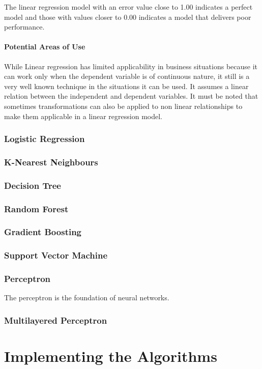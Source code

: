 \documentclass[12pt]{article}
\begin{document}
The linear regression model with an error value close to 1.00 indicates a perfect model and those with values closer to 0.00 indicates a model that delivers poor performance.

\subsection{Potential Areas of Use}
While Linear regression has limited applicability in business situations because it can work only when the dependent variable is of continuous nature, it still is a very well known technique in the situations it can be used. It assumes a linear relation between the independent and dependent variables. It must be noted that sometimes transformations can also be applied to non linear relationships to make them applicable in a linear regression model.
\newpage
\section{Logistic Regression}
\newpage
\section{K-Nearest Neighbours}
\newpage
\section{Decision Tree}
\newpage
\section{Random Forest}
\newpage
\section{Gradient Boosting}
\newpage
\section{Support Vector Machine}
\newpage
\section{Perceptron}
The perceptron is the foundation of neural networks.
\newpage
\section{Multilayered Perceptron}
\newpage
\part{Implementing the Algorithms}
\newpage
\end{document}
